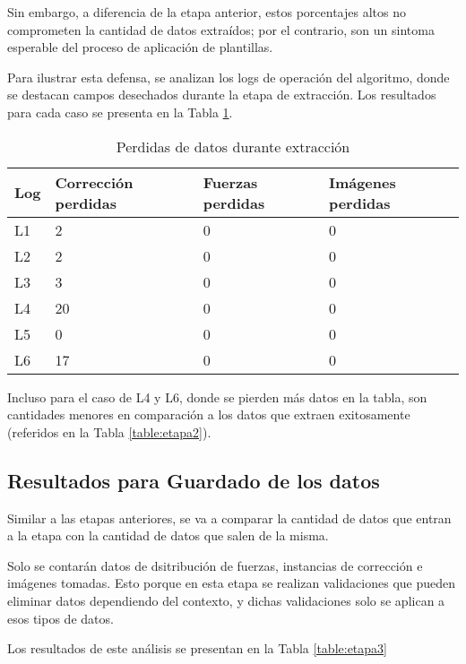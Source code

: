 Sin embargo, a diferencia de la etapa anterior, estos porcentajes altos no comprometen la cantidad de datos extraídos; por el contrario, son un sintoma esperable del proceso de aplicación de plantillas.

Para ilustrar esta defensa, se analizan los logs de operación del algoritmo, donde se destacan campos desechados durante la etapa de extracción. Los resultados para cada caso se presenta en la Tabla \ref{table:etapa2c3}.


\begin{table}[h]
    \centering
    \caption{\label{table:etapa2c3} Perdidas de datos durante extracción}
    \begin{tabular}{|p{3.5cm}|p{3.5cm}|p{3.5cm}|p{3.5cm}|}
        \hline
        Log & Corrección perdidas & Fuerzas perdidas & Imágenes perdidas \\
        \hline
        L1 & 2 & 0 & 0 \\
        \hline
        L2 & 2 & 0 & 0 \\
        \hline
        L3 & 3 & 0 & 0 \\
        \hline
        L4 & 20 & 0 & 0 \\
        \hline
        L5 & 0 & 0 & 0 \\
        \hline
        L6 & 17 & 0 & 0 \\
        \hline
    \end{tabular}
\end{table}

Incluso para el caso de L4 y L6, donde se pierden más datos en la tabla, son cantidades menores en comparación a los datos que extraen exitosamente (referidos en la Tabla \ref{table:etapa2}).

\subsection{Resultados para Guardado de los datos}

Similar a las etapas anteriores, se va a comparar la cantidad de datos que entran a la etapa con la cantidad de datos que salen de la misma. 

Solo se contarán datos de dsitribución de fuerzas, instancias de corrección e imágenes tomadas. Esto porque en esta etapa se realizan validaciones que pueden eliminar datos dependiendo del contexto, y dichas validaciones solo se aplican a esos tipos de datos.

Los resultados de este análisis se presentan en la Tabla \ref{table:etapa3}


